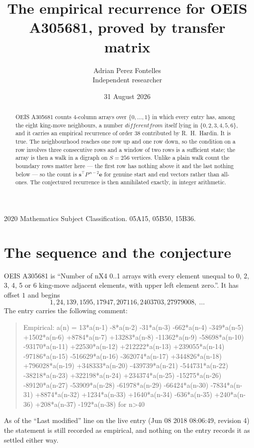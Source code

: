 \documentclass[11pt,a4paper]{article}
\title{The empirical recurrence for OEIS A305681, proved by transfer matrix}
\author{Adrian Perez Fontelles\\ \small Independent researcher}
\date{31 August 2026}
\theoremstyle{plain}
\theoremstyle{definition}
\begin{document}
\maketitle

\begin{abstract}
OEIS A305681 counts $4$-column arrays over $\{0,\dots,1\}$ in which every entry has,
among the eight king-move neighbours, a number $different from$ itself lying in $\{0,2,3,4,5,6\}$, and it carries an empirical
recurrence of order $38$ contributed by R.~H.~Hardin. It is true. The neighbourhood
reaches one row up and one row down, so the condition on a row involves three consecutive
rows and a window of two rows is a sufficient state; the array is then a walk in a digraph
on $S=256$ vertices. Unlike a plain walk count the boundary rows matter here --- the first
row has nothing above it and the last nothing below --- so the count is
$\mathbf{s}^{\!\top}P^{\,n-2}\mathbf{e}$ for genuine start and end vectors rather than
all-ones. The conjectured recurrence is then annihilated exactly, in integer arithmetic.
\end{abstract}

\noindent\small 2020 Mathematics Subject Classification. 05A15, 05B50, 15B36.\normalsize

\section{The sequence and the conjecture}

OEIS A305681 is ``Number of nX4 0..1 arrays with every element unequal to 0, 2, 3, 4, 5 or 6 king-move adjacent elements, with upper left element zero.''. It has offset
$1$ and begins
\[
1, 24, 139, 1595, 17947, 207116, 2403703, 27979008,\ \dots
\]
The entry carries the following comment:
\begin{quote}\small
Empirical: a(n) = 13*a(n-1) -8*a(n-2) -31*a(n-3) -662*a(n-4) -349*a(n-5) +1502*a(n-6) +8784*a(n-7) +13283*a(n-8) -11362*a(n-9) -58698*a(n-10) -93170*a(n-11) +22530*a(n-12) +212222*a(n-13) +239055*a(n-14) -97186*a(n-15) -516629*a(n-16) -362074*a(n-17) +344826*a(n-18) +796028*a(n-19) +348333*a(n-20) -439739*a(n-21) -544731*a(n-22) -38218*a(n-23) +322198*a(n-24) +234374*a(n-25) -15275*a(n-26) -89120*a(n-27) -53909*a(n-28) -61978*a(n-29) -66424*a(n-30) -7834*a(n-31) +8874*a(n-32) +1234*a(n-33) +1640*a(n-34) -636*a(n-35) +240*a(n-36) +208*a(n-37) -192*a(n-38) for n>40
\end{quote}
As of the ``Last modified'' line on the live entry (Jun 08 2018 08:06:49, revision
4) the statement is still recorded as empirical, and nothing on the entry
records it as settled either way.
\end{document}
